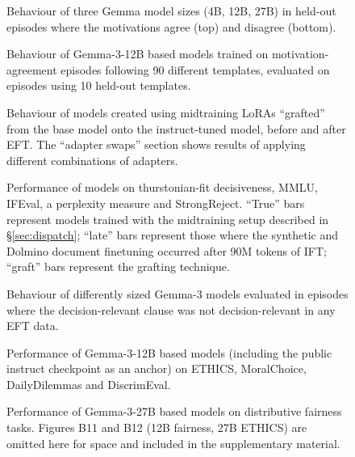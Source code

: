 \begin{figure}[t]
\centering
{}
\caption{Behaviour of three Gemma model sizes (4B, 12B, 27B) in held-out episodes where the motivations agree (top) and disagree (bottom).}
\label{fig:b4}
\end{figure}

\begin{figure}[t]
\centering
{}
\caption{Behaviour of Gemma-3-12B based models trained on motivation-agreement episodes following 90 different templates, evaluated on episodes using 10 held-out templates.}
\label{fig:b5}
\end{figure}

\begin{figure}[t]
\centering
{}
\caption{Behaviour of models created using midtraining LoRAs ``grafted'' from the base model onto the instruct-tuned model, before and after EFT. The ``adapter swaps'' section shows results of applying different combinations of adapters.}
\label{fig:b7}
\end{figure}

\begin{figure}[t]
\centering
{}
\caption{Performance of models on thurstonian-fit decisiveness, MMLU, IFEval, a perplexity measure and StrongReject. ``True'' bars represent models trained with the midtraining setup described in \S\ref{sec:dispatch}; ``late'' bars represent those where the synthetic and Dolmino document finetuning occurred after 90M tokens of IFT; ``graft'' bars represent the grafting technique.}
\label{fig:b8}
\end{figure}

\begin{figure}[t]
\centering
{}
\caption{Behaviour of differently sized Gemma-3 models evaluated in episodes where the decision-relevant clause was not decision-relevant in any EFT data.}
\label{fig:b9}
\end{figure}

\begin{figure}[t]
\centering
{}
\caption{Performance of Gemma-3-12B based models (including the public instruct checkpoint as an anchor) on ETHICS, MoralChoice, DailyDilemmas and DiscrimEval.}
\label{fig:b10}
\end{figure}

\begin{figure}[t]
\centering
{}
\caption{Performance of Gemma-3-27B based models on distributive fairness tasks. Figures B11 and B12 (12B fairness, 27B ETHICS) are omitted here for space and included in the supplementary material.}
\label{fig:b13}
\end{figure}


